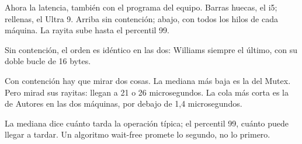 Ahora la latencia, también con el programa del equipo. Barras huecas, el i5; rellenas, el Ultra 9. Arriba sin contención; abajo, con todos los hilos de cada máquina. La rayita sube hasta el percentil 99.

Sin contención, el orden es idéntico en las dos: Williams siempre el último, con su doble bucle de 16 bytes.

Con contención hay que mirar dos cosas. La mediana más baja es la del Mutex. Pero mirad sus rayitas: llegan a 21 o 26 microsegundos. La cola más corta es la de Autores en las dos máquinas, por debajo de 1,4 microsegundos.

La mediana dice cuánto tarda la operación típica; el percentil 99, cuánto puede llegar a tardar. Un algoritmo wait-free promete lo segundo, no lo primero.
